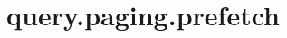 \section{query.paging.prefetch}
\label{configuration:QueryPagingPrefetch}
\AvailableInJavaOnly{\TODO}